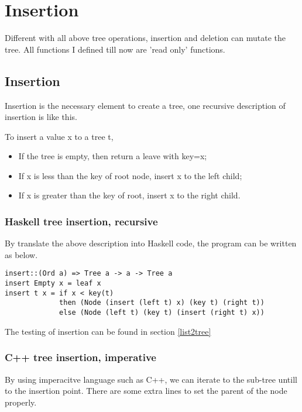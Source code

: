 \documentclass{article}
\begin{document}
\section{Insertion}

Different with all above tree operations, insertion and deletion can mutate
the tree. All functions I defined till now are 'read only' functions.

\subsection{Insertion}
Insertion is the necessary element to create a tree, one recursive description
of insertion is like this.

To insert a value x to a tree t,
\begin{itemize}
\item If the tree is empty, then return a leave with key=x;
\item If x is less than the key of root node, insert x to the left child;
\item If x is greater than the key of root, insert x to the right child.
\end{itemize}

\subsubsection*{Haskell tree insertion, recursive}
By translate the above description into Haskell code, the program can be written
as below.

\begin{lstlisting}
insert::(Ord a) => Tree a -> a -> Tree a
insert Empty x = leaf x
insert t x = if x < key(t) 
             then (Node (insert (left t) x) (key t) (right t))
             else (Node (left t) (key t) (insert (right t) x))
\end{lstlisting}

The testing of insertion can be found in section \ref{list2tree}

\subsubsection*{C++ tree insertion, imperative}

By using imperacitve language such as C++, we can iterate to the sub-tree untill
to the insertion point. There are some extra lines to set the parent of the node
properly.
\end{document}
